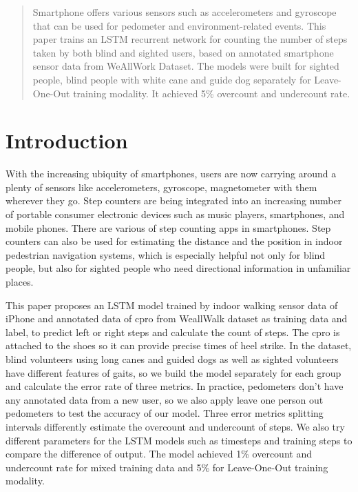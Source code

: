 \documentclass[11pt]{article}
\begin{document}
{\begin{abstract}
Smartphone offers various sensors such as accelerometers and gyroscope that can be used for pedometer and environment-related events. This paper trains an LSTM recurrent network for counting the number of steps taken by both blind and sighted users, based on annotated smartphone sensor data from WeAllWork Dataset. The models were built for sighted people, blind people with white cane and guide dog separately for Leave-One-Out training modality. It achieved 5\% overcount and undercount rate.

\end{abstract}

\section{Introduction}

With the increasing ubiquity of smartphones, users are now carrying around a plenty of sensors like accelerometers, gyroscope, magnetometer with them wherever they go. Step counters are being integrated into an increasing number of portable consumer electronic devices such as music players, smartphones, and mobile phones. There are various of step counting apps in smartphones. Step counters can also be used for estimating the distance and the position in indoor pedestrian navigation systems, which is especially helpful not only for blind people, but also for sighted people who need directional information in unfamiliar places.

This paper proposes an LSTM model trained by indoor walking sensor data of iPhone and annotated data of cpro from WeallWalk dataset as training data and label, to predict left or right steps and calculate the count of steps. The cpro is attached to the shoes so it can provide precise times of heel strike. In the dataset, blind volunteers using long canes and guided dogs as well as sighted volunteers have different features of gaits, so we build the model separately for each group and calculate the error rate of three metrics. In practice, pedometers don't have any annotated data from a new user, so we also apply leave one person out pedometers to test the accuracy of our model. Three error metrics splitting intervals differently estimate the overcount and undercount of steps. We also try different parameters for the LSTM models such as timesteps and training steps to compare the difference of output. The model achieved 1\% overcount and undercount rate for mixed training data and 5\% for Leave-One-Out training modality.



}
\end{document}
